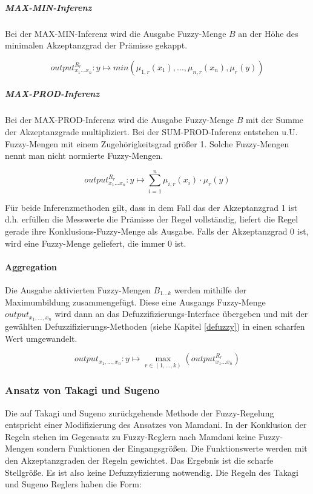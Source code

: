 \documentclass[12pt,a4paper,bibliography=totocnumbered,listof=totocnumbered, abstracton]{scrartcl}
\theoremstyle{Umgebung}
\begin{document}
\subparagraph{MAX-MIN-Inferenz}

Bei der MAX-MIN-Inferenz wird die Ausgabe Fuzzy-Menge $B$ an der Höhe des minimalen Akzeptanzgrad der Prämisse gekappt. 

\begin{equation}
	output^{R_r}_{x_1...x_n}:  y \mapsto min(\mu_{1,r}(x_1), ..., \mu_{n,r}(x_n), \mu_r(y))
\end{equation}

\subparagraph{MAX-PROD-Inferenz}

Bei der MAX-PROD-Inferenz wird die Ausgabe Fuzzy-Menge $B$ mit der Summe der Akzeptanzgrade multipliziert. Bei der SUM-PROD-Inferenz entstehen u.U. Fuzzy-Mengen mit einem Zugehörigkeitsgrad größer 1. Solche Fuzzy-Mengen nennt man nicht normierte Fuzzy-Mengen.

\begin{equation}
output^{R_r}_{x_1...x_n}:  y \mapsto \sum_{i = 1}^{n} \mu_{i,r}(x_i) \cdot \mu_r(y)
\end{equation}

Für beide Inferenzmethoden gilt, dass in dem Fall das der Akzeptanzgrad 1 ist d.h. erfüllen die Messwerte die Prämisse der Regel vollständig, liefert die Regel gerade ihre Konklusions-Fuzzy-Menge als Ausgabe. Falls der Akzeptanzgrad 0 ist, wird eine Fuzzy-Menge geliefert, die immer 0 ist.

\paragraph{Aggregation}

Die Ausgabe aktivierten Fuzzy-Mengen $B_{1...k}$ werden mithilfe der Maximumbildung zusammengefügt. Diese eine Ausgangs Fuzzy-Menge $	output_{x_1,..., x_n}$ wird dann an das Defuzzifizierungs-Interface übergeben und mit der gewählten Defuzzifizierungs-Methoden (siehe Kapitel \ref{defuzzy}) in einen scharfen Wert umgewandelt.

\begin{equation}
	output_{x_1,..., x_n}: y \mapsto \max_{r \in (1,...,k)}(output^{R_r}_{x_1...x_n})
\end{equation}

\subsubsection{Ansatz von Takagi und Sugeno}

Die auf Takagi und Sugeno zurückgehende Methode der Fuzzy-Regelung entspricht einer Modifizierung des Ansatzes von Mamdani. In der Konklusion der Regeln stehen im Gegensatz zu Fuzzy-Reglern nach Mamdani keine Fuzzy-Mengen sondern Funktionen der Eingangsgrößen. Die Funktionswerte werden mit den Akzeptanzgraden  der Regeln gewichtet. Das Ergebnis ist die scharfe Stellgröße. Es ist also keine Defuzzyfizierung notwendig. Die Regeln des Takagi und Sugeno Reglers haben die Form:
\end{document}
